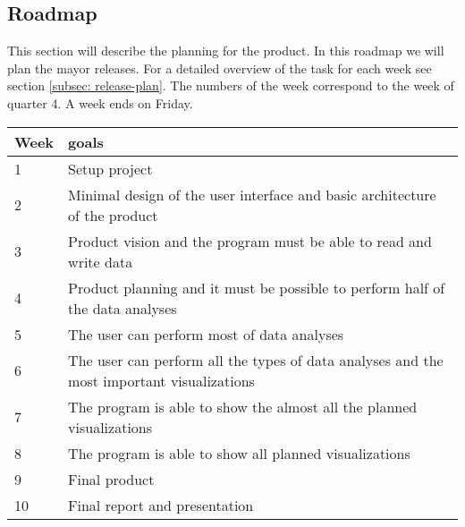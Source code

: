 \subsection{Roadmap}
This section will describe the planning for the product. In this roadmap we will plan the mayor releases. For a detailed overview of the task for each week see section \ref{subsec: release-plan}. The numbers of the week correspond to the week of quarter 4. A week ends on Friday.\\
\begin{tabular}{ l l }
Week & goals \\
\hline
1 & Setup project \\
2 & Minimal design of the user interface and basic architecture of the product \\
3 & Product vision and the program must be able to read and write data\\
4 & Product planning and it must be possible to perform half of the data analyses\\
5 & The user can perform most of data analyses \\
6 & The user can perform all the types of data analyses and the most important visualizations \\
7 & The program is able to show the almost all the planned visualizations \\
8 & The program is able to show all planned visualizations \\
9 & Final product \\
10 & Final report and presentation
\end{tabular}
